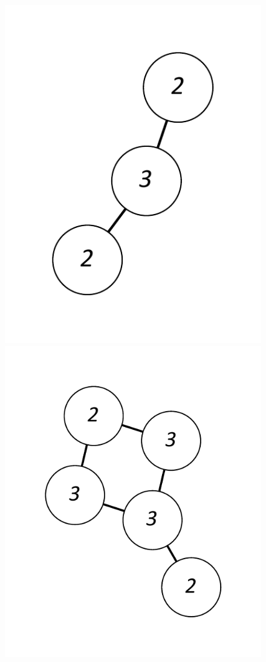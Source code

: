 \documentclass[12pt]{article}
\theoremstyle{plain}
\theoremstyle{definition}
\theoremstyle{remark}
\begin{document}
\begin{figure}[htb]
		\includegraphics[scale=0.25]{Delta3TriangleFree/011[2,2,3].pdf}
		\includegraphics[scale=0.25]{Delta3TriangleFree/0011011010[3,3,2,2,3].pdf}

\end{figure}
\end{document}
